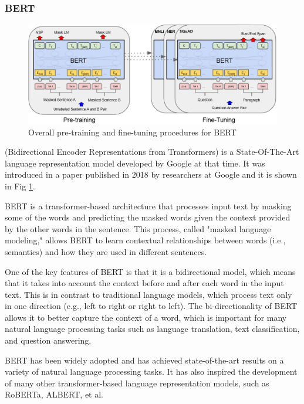 \documentclass[sigconf]{acmart}
\begin{document}
{\subsubsection{BERT}
\begin{figure}
    \centering
    \includegraphics[width=1\linewidth]{figure/BERT.png}
    \caption{Overall pre-training and fine-tuning procedures for BERT\cite{devlin2018bert}}
    \label{bert}
\end{figure}
\cite{devlin2018bert}(Bidirectional Encoder Representations from Transformers) is a State-Of-The-Art language representation model developed by Google at that time. It was introduced in a paper published in 2018 by researchers at Google and it is shown in Fig \ref{bert}.

BERT is a transformer-based architecture that processes input text by masking some of the words and predicting the masked words given the context provided by the other words in the sentence. This process, called "masked language modeling," allows BERT to learn contextual relationships between words (i.e., semantics) and how they are used in different sentences.

One of the key features of BERT is that it is a bidirectional model, which means that it takes into account the context before and after each word in the input text. This is in contrast to traditional language models, which process text only in one direction (e.g., left to right or right to left). The bi-directionality of BERT allows it to better capture the context of a word, which is important for many natural language processing tasks such as language translation, text classification, and question answering.

BERT has been widely adopted and has achieved state-of-the-art results on a variety of natural language processing tasks. It has also inspired the development of many other transformer-based language representation models, such as RoBERTa, ALBERT, et al.
}
\end{document}
